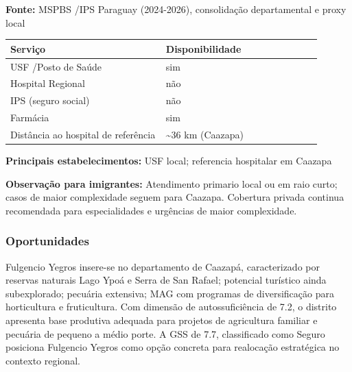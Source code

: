 \textbf{Fonte:} MSPBS /\allowbreak  IPS Paraguay (2024-2026), consolidação
departamental e proxy local

{\def\LTcaptype{none} %
\begin{longtable}{@{}>{\raggedright\arraybackslash}p{0.45\linewidth} >{\raggedright\arraybackslash}p{0.45\linewidth}@{}}
\toprule\noalign{}
Serviço & Disponibilidade \\
\midrule\noalign{}
\endhead
\bottomrule\noalign{}
\endlastfoot
USF /\allowbreak  Posto de Saúde & sim \\
Hospital Regional & não \\
IPS (seguro social) & não \\
Farmácia & sim \\
Distância ao hospital de referência & \textasciitilde36 km (Caazapa) \\
\end{longtable}
}

\textbf{Principais estabelecimentos:} USF local; referencia hospitalar
em Caazapa

\textbf{Observação para imigrantes:} Atendimento primario local ou em
raio curto; casos de maior complexidade seguem para Caazapa. Cobertura
privada continua recomendada para especialidades e urgências de maior
complexidade.
\newpage

\subsubsection*{Oportunidades}\label{oport-fulgencio-yegros-0605}
Fulgencio Yegros insere-se no departamento de Caazapá, caracterizado por reservas naturais Lago Ypoá e Serra de San Rafael; potencial turístico ainda subexplorado; pecuária extensiva; MAG com programas de diversificação para horticultura e fruticultura. Com dimensão de autossuficiência de 7.2, o distrito apresenta base produtiva adequada para projetos de agricultura familiar e pecuária de pequeno a médio porte. A GSS de 7.7, classificado como Seguro posiciona Fulgencio Yegros como opção concreta para realocação estratégica no contexto regional.

